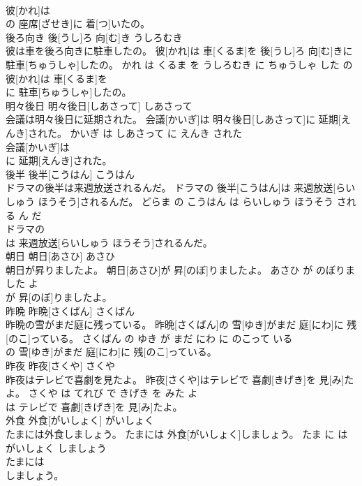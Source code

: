 \documentclass[8pt]{extreport}
\begin{document}
\begin{CJK}{UTF8}{min}
\\	彼[かれ]は
\\	の 座席[ざせき]に 着[つ]いたの。			
\\	後ろ向き	後[うし]ろ 向[む]き	うしろむき	
\\	彼は車を後ろ向きに駐車したの。	彼[かれ]は 車[くるま]を 後[うし]ろ 向[む]きに 駐車[ちゅうしゃ]したの。	かれ は くるま を うしろむき に ちゅうしゃ した の	
\\	彼[かれ]は 車[くるま]を
\\	に 駐車[ちゅうしゃ]したの。			
\\	明々後日	明々後日[しあさって]	しあさって	
\\	会議は明々後日に延期された。	会議[かいぎ]は 明々後日[しあさって]に 延期[えんき]された。	かいぎ は しあさって に えんき された	
\\	会議[かいぎ]は
\\	に 延期[えんき]された。			
\\	後半	後半[こうはん]	こうはん	
\\	ドラマの後半は来週放送されるんだ。	ドラマの 後半[こうはん]は 来週放送[らいしゅう ほうそう]されるんだ。	どらま の こうはん は らいしゅう ほうそう される ん だ	
\\	ドラマの
\\	は 来週放送[らいしゅう ほうそう]されるんだ。			
\\	朝日	朝日[あさひ]	あさひ	
\\	朝日が昇りましたよ。	朝日[あさひ]が 昇[のぼ]りましたよ。	あさひ が のぼりました よ	
\\	が 昇[のぼ]りましたよ。			
\\	昨晩	昨晩[さくばん]	さくばん	
\\	昨晩の雪がまだ庭に残っている。	昨晩[さくばん]の 雪[ゆき]がまだ 庭[にわ]に 残[のこ]っている。	さくばん の ゆき が まだ にわ に のこって いる	
\\	の 雪[ゆき]がまだ 庭[にわ]に 残[のこ]っている。			
\\	昨夜	昨夜[さくや]	さくや	
\\	昨夜はテレビで喜劇を見たよ。	昨夜[さくや]はテレビで 喜劇[きげき]を 見[み]たよ。	さくや は てれび で きげき を みた よ	
\\	は テレビで 喜劇[きげき]を 見[み]たよ。			
\\	外食	外食[がいしょく]	がいしょく	
\\	たまには外食しましょう。	たまには 外食[がいしょく]しましょう。	たま に は がいしょく しましょう	
\\	たまには
\\	しましょう。			

\end{CJK}
\end{document}
